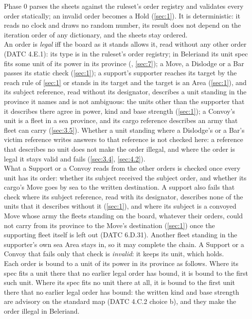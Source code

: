 \documentclass[12pt,a4paper]{article}
\begin{document}
Phase 0 parses the sheets against the ruleset's order registry and validates every order statically; an invalid order becomes a Hold (\cref{sec:1}).
It is deterministic: it reads no clock and draws no random number, its result does not depend on the iteration order of any dictionary, and the sheets stay ordered.\\
An order is \emph{legal} iff the board as it stands allows it, read without any other order (DATC 4.E.1): its type is in the ruleset's order registry; in Beleriand its unit spec fits some unit of its power in its province (, \cref{sec:7}); a Move, a Dislodge or a Bar passes its static check (\cref{sec:1}); a support's supporter reaches its target by the reach rule of \cref{sec:1} or stands in its target and the target is an Area (\cref{sec:1}), and its subject reference, read without its designator, describes a unit standing in the province it names and is not ambiguous: the units other than the supporter that it describes there agree in power, kind and base strength (\cref{sec:1}); a Convoy's unit is a fleet in a sea province, and its cargo reference describes an army that fleet can carry (\cref{sec:3.5}).
Whether a unit standing where a Dislodge's or a Bar's victim reference writes answers to that reference is not checked here: a reference that describes no unit does not make the order illegal, and where the order is legal it stays valid and fails (\cref{sec:3.4}, \cref{sec:4.2}).\\
What a Support or a Convoy reads from the other orders is checked once every unit has its order: whether its subject received the subject order, and whether its cargo's Move goes by sea to the written destination.
A support also fails that check where its subject reference, read with its designator, describes none of the units that it describes without it (\cref{sec:1}), and where its subject is a convoyed Move whose army the fleets standing on the board, whatever their orders, could not carry from its province to the Move's destination (\cref{sec:1}) once the supporting fleet itself is left out (DATC 6.D.31).
Another fleet standing in the supporter's own sea Area stays in, so it may complete the chain.
A Support or a Convoy that fails only that check is \emph{invalid}: it keeps its unit, which holds.\\
Each order is bound to a unit of its power in its province as follows.
Where its spec fits a unit there that no earlier legal order has bound, it is bound to the first such unit.
Where its spec fits no unit there at all, it is bound to the first unit there that no earlier legal order has bound: the written kind and base strength are advisory on the standard map (DATC 4.C.2 choice b), and they make the order illegal in Beleriand.
\end{document}
